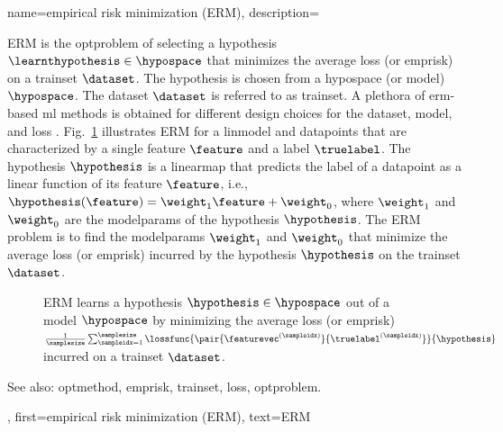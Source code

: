 {name={empirical risk minimization (ERM)}, 
	description={ERM is the \gls{optproblem} of 
	selecting a \gls{hypothesis} $\learnthypothesis \in \hypospace$ that minimizes the 
	average \gls{loss} (or \gls{emprisk}) on a \gls{trainset} $\dataset$. 
	The \gls{hypothesis} is chosen from a \gls{hypospace} (or \gls{model}) $\hypospace$. 
	The \gls{dataset} $\dataset$ is referred to as \gls{trainset}. A plethora of \gls{erm}-based 
	\gls{ml} methods is obtained for different design choices for the \gls{dataset}, \gls{model}, 
	and \gls{loss} \cite[Ch. 3]{MLBasics}. Fig.\ \ref{fig_erm_dict} illustrates ERM for a \gls{linmodel} 
	and \glspl{datapoint} that are characterized by a single \gls{feature} $\feature$ and a \gls{label} $\truelabel$. 
	The \gls{hypothesis} $\hypothesis$ is a \gls{linearmap} that predicts the \gls{label} 
	of a \gls{datapoint} as a linear \gls{function} of its \gls{feature} $\feature$, i.e., 
		$\hypothesis(\feature) = \weight_{1} \feature + \weight_{0}$, where $\weight_{1}$ 
	and $\weight_{0}$ are the \glspl{modelparam} of the \gls{hypothesis} $\hypothesis$. 
	The ERM problem is to find the \glspl{modelparam} $\weight_{1}$ and $\weight_{0}$ that 
	minimize the average \gls{loss} (or \gls{emprisk}) incurred by the \gls{hypothesis} 
	$\hypothesis$ on the \gls{trainset} $\dataset$.
    \begin{figure}[H]
\begin{center}
\caption{ERM learns a \gls{hypothesis} $\hypothesis \in \hypospace$ 
out of a \gls{model} $\hypospace$ by minimizing the average \gls{loss} 
(or \gls{emprisk}) $\frac{1}{\samplesize} \sum_{\sampleidx=1}^\samplesize \lossfunc{\pair{\featurevec^{(\sampleidx)}}{ \truelabel^{(\sampleidx)}}}{\hypothesis}$ incurred on a \gls{trainset} $\dataset$.}
\label{fig_erm_dict}
\end{center}
\end{figure}
		See also: \gls{optmethod}, \gls{emprisk}, \gls{trainset}, \gls{loss}, \gls{optproblem}.},
	first={empirical risk minimization (ERM)},
	text={ERM} 
}

